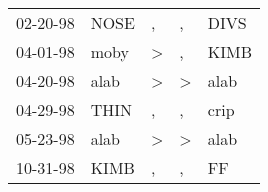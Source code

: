 \begin{supertabular}{lllll}
 02-20-98 &  NOSE &             , &             , &  DIVS \\
 04-01-98 &  moby &  \textgreater &             , &  KIMB \\
 04-20-98 &  alab &  \textgreater &  \textgreater &  alab \\
 04-29-98 &  THIN &             , &             , &  crip \\
 05-23-98 &  alab &  \textgreater &  \textgreater &  alab \\
 10-31-98 &  KIMB &             , &             , &    FF \\
\end{supertabular}
